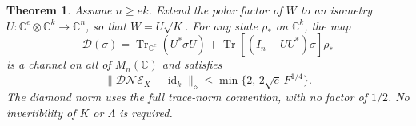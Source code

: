 \documentclass[11pt]{article}
\newcommand{\C}{\mathbb C}
\DeclareMathOperator{\Tr}{Tr}
\newtheorem{theorem}{Theorem}[section]
\theoremstyle{remark}
\numberwithin{equation}{section}
\begin{document}
\begin{theorem}\label{thm:recovery}
Assume $n\ge ek$. Extend the polar factor of $W$ to an isometry
$U:\C^e\otimes\C^k\to\C^n$, so that $W=U\sqrt K$.
For any state $\rho_*$ on $\C^k$, the map
\begin{equation}\label{eq:decoder}
 \mathcal D(\sigma)=\Tr_{\C^e}(U^*\sigma U)
       +\Tr[(I_n-UU^*)\sigma]\rho_*
\end{equation}
is a channel on all of $M_n(\C)$ and satisfies
\begin{equation}\label{eq:diamond-bound}
 \|\mathcal D\mathcal N\mathcal E_X-\operatorname{id}_k\|_\diamond
 \le\min\{2,\,2\sqrt e\,F^{1/4}\}.
\end{equation}
The diamond norm uses the full trace-norm convention, with no factor
of $1/2$. No invertibility of $K$ or $\Lambda$ is required.
\end{theorem}
\end{document}
